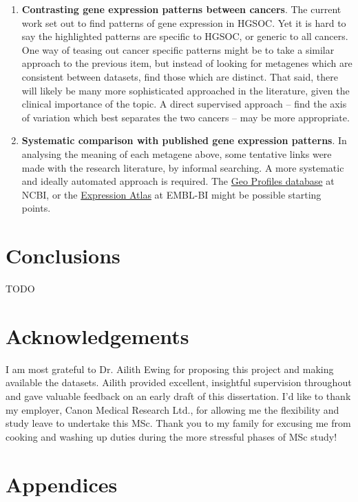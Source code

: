\documentclass[tikz, 12pt,a4paper,oneside,fleqn]{article}
\begin{document}
\begin{enumerate}
\item
{\bf Contrasting gene expression patterns between cancers}.  The current work set out to find patterns of gene expression in HGSOC.  Yet it is hard to say the highlighted patterns are specific to HGSOC, or generic to all cancers.  One way of teasing out cancer specific patterns might be to take a similar approach to the previous item, but instead of looking for metagenes which are consistent between datasets, find those which are distinct.  That said, there will likely be many more sophisticated approached in the literature, given the clinical importance of the topic.  A direct supervised approach -- find the axis of variation which best separates the two cancers -- may be more appropriate.
\item
{\bf Systematic comparison with published gene expression patterns}.  In analysing the meaning of each metagene above, some tentative links were made with the research literature, by informal searching.   A more systematic and ideally automated approach is required.  The \href{https://www.ncbi.nlm.nih.gov/geoprofiles}{Geo Profiles database} at NCBI, or the \href{https://www.ebi.ac.uk/gxa/home}{Expression Atlas} at EMBL-BI might be possible starting points.

\end{enumerate}

\FloatBarrier

\section{Conclusions}
TODO

\section*{Acknowledgements}
I am most grateful to Dr. Ailith Ewing for proposing this project and making available the datasets.  Ailith provided excellent, insightful supervision throughout and gave valuable feedback on an early draft of this dissertation.  I'd like to thank my employer, Canon Medical Research Ltd., for allowing me the flexibility and study leave to undertake this MSc.  Thank you to my family for excusing me from cooking and washing up duties during the more stressful phases of MSc study!

\small


\normalsize

\newpage
\section{Appendices}
\end{document}
